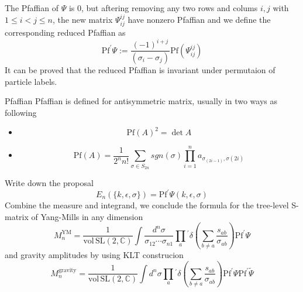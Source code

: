 \documentclass{beamer}
\begin{document}
\begin{frame}
    The Pfaffian of $\Psi$ is 0, but aftering removing any two rows and colums $i,j$ with $1\leq i< j\leq n$, 
    the new matrix $\Psi_{ij}^{ij}$ have nonzero Pfaffian and we define the corresponding reduced Pfaffian as
    \begin{equation*}
            \boxed{
            \mathrm{Pf}^{\prime}\Psi:=\frac{(-1)^{i+j}}{(\sigma_i-\sigma_j)}\mathrm{Pf}(\Psi_{ij}^{ij})}
    \end{equation*}
    It can be proved that the reduced Pfaffian is invariant under permutaion of \alert{particle labels}.
    \pause
    \begin{alertblock}{Pfaffian}
        Pfaffian is defined for antisymmetric matrix, usually in two ways as following
        \begin{itemize}
            \item \begin{equation*}
                \mathrm{Pf}(A)^2=\det A
            \end{equation*}
            \item \begin{equation*}
                \mathrm{Pf}(A)=\frac{1}{2^n n!}\sum_{\sigma \in S_{2n}}sgn(\sigma)\prod_{i=1}^n a_{\sigma_{(2i-1)},\sigma(2i)}
            \end{equation*}
        \end{itemize}
    \end{alertblock}
\end{frame}
\begin{frame}
    Write down the proposal
    \alert{
    \begin{equation*}
        E_n(\{k,\epsilon,\sigma\})=\mathrm{Pf}^\prime \Psi(k,\epsilon,\sigma)
    \end{equation*}}
    Combine the measure and integrand, we conclude the formula for the tree-level S-matrix of Yang-Mills in any dimension
    \begin{equation*}
        M_n^{\mathrm{YM}}=\frac{1}{\mathrm{vol\,SL}(2,\mathbb{C})}\int\frac{d^n\sigma}{\sigma_{12}\cdots\sigma_{n1}}\prod_{a}{}^{\prime}\delta{\left(\sum_{b\neq a}\frac{s_{ab}}{\sigma_{ab}}\right)}\mathrm{Pf}^{\prime}\Psi
    \end{equation*}
    and gravity amplitudes by using KLT construcion
    \begin{equation*}
        M_n^{\mathrm{gravity}}=\frac{1}{\mathrm{vol\,SL}(2,\mathbb{C})}\int d^n\sigma\prod_{a}{}^{\prime}\delta{\left(\sum_{b\neq a}\frac{s_{ab}}{\sigma_{ab}}\right)}\mathrm{Pf}^{\prime}\Psi\mathrm{Pf}^{\prime}\tilde{\Psi}
    \end{equation*}
\end{frame}
\end{document}
